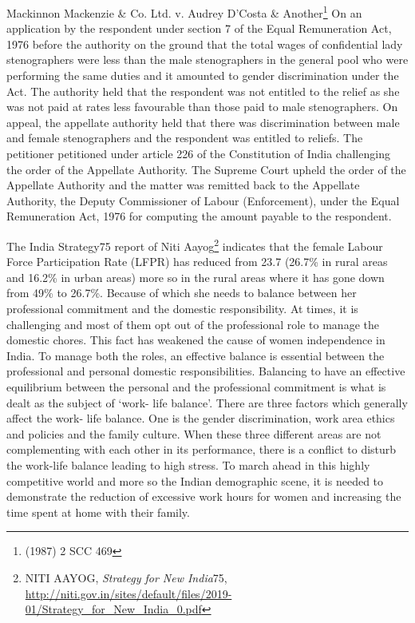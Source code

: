 \begin{multicols}{2}
\noi
Mackinnon Mackenzie \& Co. Ltd. v. Audrey D’Costa \& Another\footnote{(1987) 2 SCC 469} On an application by the
respondent under section 7 of the Equal Remuneration Act, 1976 before the authority on the
ground that the total wages of confidential lady stenographers were less than the male
stenographers in the general pool who were performing the same duties and it amounted to
gender discrimination under the Act. The authority held that the respondent was not entitled
to the relief as she was not paid at rates less favourable than those paid to male stenographers.
On appeal, the appellate authority held that there was discrimination between male and
female stenographers and the respondent was entitled to reliefs. The petitioner petitioned
under article 226 of the Constitution of India challenging the order of the Appellate
Authority. The Supreme Court upheld the order of the Appellate Authority and the matter
was remitted back to the Appellate Authority, the Deputy Commissioner of Labour
(Enforcement), under the Equal Remuneration Act, 1976 for computing the amount payable
to the respondent.

\vspace{.1cm}


\vspace{.1cm}

\noi
The India Strategy\@75 report of Niti Aayog\footnote{NITI AAYOG, \textit{Strategy for New India}\@75, \url{http://niti.gov.in/sites/default/files/2019- 01/Strategy_for_New_India_0.pdf}} indicates that the female Labour Force
Participation Rate (LFPR) has reduced from 23.7 (26.7\% in rural areas and 16.2\% in urban areas) more so in the rural areas where it has gone down from 49\% to 26.7\%. Because of which she needs to balance between her professional commitment and the domestic
responsibility. At times, it is challenging and most of them opt out of the professional role to
manage the domestic chores. This fact has weakened the cause of women independence in
India. To manage both the roles, an effective balance is essential between the professional
and personal domestic responsibilities. Balancing to have an effective equilibrium between
the personal and the professional commitment is what is dealt as the subject of ‘work- life
balance’. There are three factors which generally affect the work- life balance. One is the
gender discrimination, work area ethics and policies and the family culture. When these three
different areas are not complementing with each other in its performance, there is a conflict to
disturb the work-life balance leading to high stress. To march ahead in this highly
competitive world and more so the Indian demographic scene, it is needed to demonstrate the
reduction of excessive work hours for women and increasing the time spent at home with
their family.


\end{multicols}
